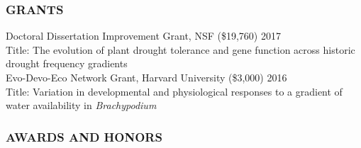 \documentclass[12pt,english]{article}
\begin{document}

\subsubsection*{GRANTS}
\vspace{-0.5ex}
\hspace*{1.0em} Doctoral Dissertation Improvement Grant, NSF (\$19,760)
\hfill 
2017\\
\hspace*{2.0em} Title: The evolution of plant drought tolerance and gene function across historic \hspace*{2.0em}drought frequency gradients 
\vspace{1ex}\\
\hspace*{1.0em} Evo-Devo-Eco Network Grant, Harvard University (\$3,000)
\hfill 
2016\\
\hspace*{2.0em} Title: Variation  in  developmental  and  physiological  responses  to  a  gradient  of  water  \hspace*{2.0em} availability in \textit{Brachypodium} 
\vspace{1ex}


\subsubsection*{AWARDS AND HONORS}
\vspace{-0.5ex}
\end{document}
